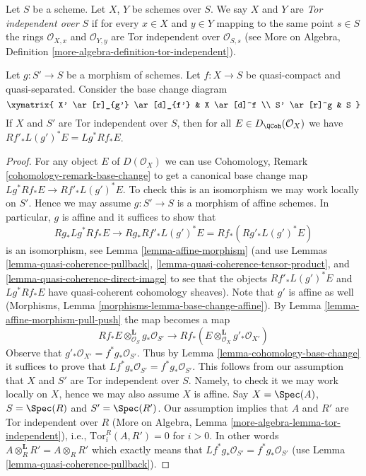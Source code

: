 \begin{definition}
\label{definition-tor-independent}
Let $S$ be a scheme. Let $X$, $Y$ be schemes over $S$. We say $X$ and
$Y$ are {\it Tor independent over $S$} if for every $x \in X$ and
$y \in Y$ mapping to the same point $s \in S$ the rings
$\mathcal{O}_{X, x}$ and $\mathcal{O}_{Y, y}$ are Tor independent
over $\mathcal{O}_{S, s}$ (see
More on Algebra, Definition \ref{more-algebra-definition-tor-independent}).
\end{definition}

\begin{lemma}
\label{lemma-compare-base-change}
Let $g : S' \to S$ be a morphism of schemes.
Let $f : X \to S$ be quasi-compact and quasi-separated.
Consider the base change diagram
$$
\xymatrix{
X' \ar[r]_{g'} \ar[d]_{f'} &
X \ar[d]^f \\
S' \ar[r]^g &
S
}
$$
If $X$ and $S'$ are Tor independent over $S$, then for all
$E \in D_\QCoh(\mathcal{O}_X)$ we have
$Rf'_*L(g')^*E = Lg^*Rf_*E$.
\end{lemma}

\begin{proof}
For any object $E$ of $D(\mathcal{O}_X)$ we can use
Cohomology, Remark \ref{cohomology-remark-base-change} to get a
canonical base change map $Lg^*Rf_*E \to Rf'_*L(g')^*E$. To check this
is an isomorphism we may work locally on $S'$. Hence we may assume
$g : S' \to S$ is a morphism of affine schemes. In particular, $g$
is affine and it suffices to show that
$$
Rg_*Lg^*Rf_*E \to Rg_*Rf'_*L(g')^*E = Rf_*(Rg'_* L(g')^* E)
$$
is an isomorphism, see Lemma \ref{lemma-affine-morphism}
(and use Lemmas \ref{lemma-quasi-coherence-pullback},
\ref{lemma-quasi-coherence-tensor-product}, and
\ref{lemma-quasi-coherence-direct-image}
to see that the objects $Rf'_*L(g')^*E$ and $Lg^*Rf_*E$
have quasi-coherent cohomology sheaves). Note that $g'$ is
affine as well (Morphisms, Lemma \ref{morphisms-lemma-base-change-affine}).
By Lemma \ref{lemma-affine-morphism-pull-push} the map becomes a map
$$
Rf_*E \otimes_{\mathcal{O}_S}^\mathbf{L} g_*\mathcal{O}_{S'}
\longrightarrow
Rf_*(E \otimes_{\mathcal{O}_X}^\mathbf{L} g'_*\mathcal{O}_{X'})
$$
Observe that $g'_*\mathcal{O}_{X'} = f^*g_*\mathcal{O}_{S'}$. Thus by
Lemma \ref{lemma-cohomology-base-change} it suffices to prove that
$Lf^*g_*\mathcal{O}_{S'} = f^*g_*\mathcal{O}_{S'}$. This follows from our
assumption that $X$ and $S'$ are Tor independent over $S$. Namely, to
check it we may work locally on $X$, hence we may also assume $X$ is affine.
Say $X = \Spec(A)$, $S = \Spec(R)$ and $S' = \Spec(R')$. Our assumption
implies that $A$ and $R'$ are Tor independent over $R$
(More on Algebra, Lemma \ref{more-algebra-lemma-tor-independent}), i.e.,
$\text{Tor}_i^R(A, R') = 0$ for $i > 0$. In other words
$A \otimes_R^\mathbf{L} R' = A \otimes_R R'$ which exactly means
that $Lf^*g_*\mathcal{O}_{S'} = f^*g_*\mathcal{O}_{S'}$
(use Lemma \ref{lemma-quasi-coherence-pullback}).
\end{proof}

